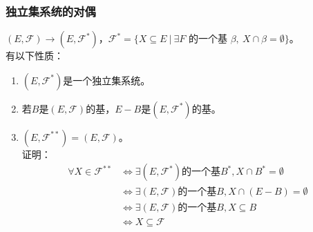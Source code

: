 \subsubsection{独立集系统的对偶}
$(E, \mathcal{F}) \rightarrow (E, \mathcal{F}^*)$，$\mathcal{F}^* = \{X \subseteq E \ | \ \exists F$ 的一个基 $\beta, \ X \cap \beta = \emptyset\}$。 \\
有以下性质：
\begin{enumerate}
    \item $(E, \mathcal{F}^*)$是一个独立集系统。
    \item 若$B$是$(E, \mathcal{F})$的基，$E - B$是$(E, \mathcal{F}^*)$的基。
    \item $(E, \mathcal{F}^{**}) = (E, \mathcal{F})$。 \\
    证明：
    \begin{align}
        \nonumber
        \forall X \in \mathcal{F}^{**} & \iff 
        \exists (E, \mathcal{F}^*) \mbox{的一个基}B^*, X \cap B^* = \emptyset \\ & \iff \nonumber
        \exists (E, \mathcal{F}) \mbox{的一个基}B, X \cap (E - B) = \emptyset \\ & \iff \nonumber
        \exists (E, \mathcal{F}) \mbox{的一个基}B, X \subseteq B \\ & \iff \nonumber
        X \subseteq \mathcal{F} \nonumber
    \end{align}
\end{enumerate}

